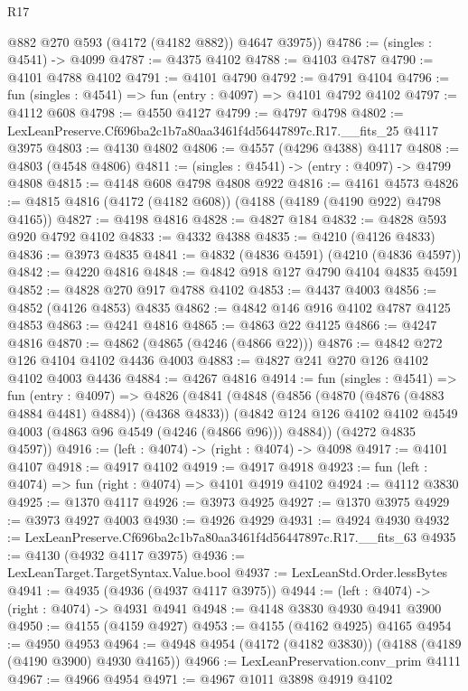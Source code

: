 \begin{lexlean}{R17}
\begin{coremodule}
        @882
        @270
        @593
        (@4172 (@4182 @882))
        @4647
        @3975))
@4786 := (singles : @4541) -> @4099
@4787 := @4375 @4102
@4788 := @4103 @4787
@4790 := @4101 @4788 @4102
@4791 := @4101 @4790
@4792 := @4791 @4104
@4796 := fun (singles : @4541) => fun (entry : @4097) => @4101 @4792 @4102
@4797 := @4112 @608
@4798 := @4550 @4127
@4799 := @4797 @4798
@4802 := LexLeanPreserve.Cf696ba2c1b7a80aa3461f4d56447897c.R17.__fits_25 @4117 @3975
@4803 := @4130 @4802
@4806 := @4557 (@4296 @4388) @4117
@4808 := @4803 (@4548 @4806)
@4811 := (singles : @4541) -> (entry : @4097) -> @4799 @4808
@4815 := @4148 @608 @4798 @4808 @922
@4816 := @4161 @4573
@4826 := @4815 @4816 (@4172 (@4182 @608)) (@4188 (@4189 (@4190 @922) @4798 @4165))
@4827 := @4198 @4816
@4828 := @4827 @184
@4832 := @4828 @593 @920 @4792 @4102
@4833 := @4332 @4388
@4835 := @4210 (@4126 @4833)
@4836 := @3973 @4835
@4841 := @4832 (@4836 @4591) (@4210 (@4836 @4597))
@4842 := @4220 @4816
@4848 := @4842 @918 @127 @4790 @4104 @4835 @4591
@4852 := @4828 @270 @917 @4788 @4102
@4853 := @4437 @4003
@4856 := @4852 (@4126 @4853) @4835
@4862 := @4842 @146 @916 @4102 @4787 @4125 @4853
@4863 := @4241 @4816
@4865 := @4863 @22 @4125
@4866 := @4247 @4816
@4870 := @4862 (@4865 (@4246 (@4866 @22)))
@4876 := @4842 @272 @126 @4104 @4102 @4436 @4003
@4883 := @4827 @241 @270 @126 @4102 @4102 @4003 @4436
@4884 := @4267 @4816
@4914 := fun (singles : @4541) =>
  fun (entry : @4097) =>
  @4826
    (@4841
      (@4848
        (@4856 (@4870 (@4876 (@4883 @4884 @4481) @4884)) (@4368 @4833))
        (@4842 @124 @126 @4102 @4102 @4549 @4003 (@4863 @96 @4549 (@4246 (@4866 @96))) @4884))
      (@4272 @4835 @4597))
@4916 := (left : @4074) -> (right : @4074) -> @4098
@4917 := @4101 @4107
@4918 := @4917 @4102
@4919 := @4917 @4918
@4923 := fun (left : @4074) => fun (right : @4074) => @4101 @4919 @4102
@4924 := @4112 @3830
@4925 := @1370 @4117
@4926 := @3973 @4925
@4927 := @1370 @3975
@4929 := @3973 @4927 @4003
@4930 := @4926 @4929
@4931 := @4924 @4930
@4932 := LexLeanPreserve.Cf696ba2c1b7a80aa3461f4d56447897c.R17.__fits_63
@4935 := @4130 (@4932 @4117 @3975)
@4936 := LexLeanTarget.TargetSyntax.Value.bool
@4937 := LexLeanStd.Order.lessBytes
@4941 := @4935 (@4936 (@4937 @4117 @3975))
@4944 := (left : @4074) -> (right : @4074) -> @4931 @4941
@4948 := @4148 @3830 @4930 @4941 @3900
@4950 := @4155 (@4159 @4927)
@4953 := @4155 (@4162 @4925) @4165
@4954 := @4950 @4953
@4964 := @4948 @4954 (@4172 (@4182 @3830)) (@4188 (@4189 (@4190 @3900) @4930 @4165))
@4966 := LexLeanPreservation.conv_prim @4111
@4967 := @4966 @4954
@4971 := @4967 @1011 @3898 @4919 @4102

\end{coremodule}
\end{lexlean}
